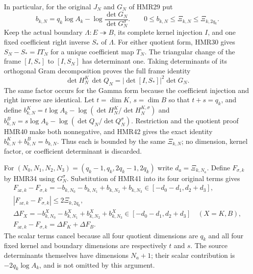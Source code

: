 \documentclass[11pt,a4paper]{article}
\begin{document}
In particular, for the original $J_N$ and $G_N$ of HMR29 put
\[
 b_{k,N}=q_k\log A_k-\log\frac{\det G_N}{\det G_N^\sigma}.
 \qquad 0\leq b_{k,N}\leq\Xi_{k,N}\leq\Xi_{k,2q_k}.
 \tag{HMR41}
\]
Keep the actual boundary $\Lambda:E\twoheadrightarrow B$,
its complete kernel injection $I$, and one fixed coefficient
right inverse $S_*$ of $\Lambda$. For either quotient form,
HMR30 gives $S_N-S_*=IT_N$ for a unique coefficient map $T_N$.
The triangular change of the frame $[I,S_*]$ to $[I,S_N]$
has determinant one. Taking determinants of its orthogonal
Gram decomposition proves the full frame identity
\[
 \det H_N^K\,\det Q_N
       =|\det[I,S_*]|^2\det G_N .
 \tag{HMR42}
\]
The same factor occurs for the Gamma form because the
coefficient injection and right inverse are identical.
Let $t=\dim K$, $s=\dim B$ so that $t+s=q_k$, and define
$b^K_{k,N}=t\log A_k-\log(\det H_N^K/\det H_N^{K,\sigma})$
and
$b^B_{k,N}=s\log A_k-\log(\det Q_N/\det Q_N^\sigma)$.
Restriction and the quotient proof HMR40 make both
nonnegative, and HMR42 gives the exact identity
$b^K_{k,N}+b^B_{k,N}=b_{k,N}$.
Thus each is bounded by the same $\Xi_{k,N}$; no dimension,
kernel factor, or coefficient determinant is discarded.

For $(N_0,N_1,N_2,N_3)=(q_k-1,q_k,2q_k-1,2q_k)$
write $d_a=\Xi_{k,N_a}$. Define $F_{\sigma,k}$ by HMR34
using $G_N^\sigma$. Substitution of HMR41 into its four
original terms gives
\[
\begin{gathered}
 F_{\mathrm{ar},k}-F_{\sigma,k}
       =-b_{k,N_0}-b_{k,N_1}+b_{k,N_2}+b_{k,N_3}
       \in[-d_0-d_1,d_2+d_3],\\
 |F_{\mathrm{ar},k}-F_{\sigma,k}|\leq2\Xi_{k,2q_k},\\
 \Delta F_X=-b^X_{k,N_0}-b^X_{k,N_1}
             +b^X_{k,N_2}+b^X_{k,N_3}
       \in[-d_0-d_1,d_2+d_3]\quad(X=K,B),\\
 F_{\mathrm{ar},k}-F_{\sigma,k}=\Delta F_K+\Delta F_B.
\end{gathered}\tag{HMR43}
\]
The scalar terms cancel because all four quotient dimensions
are $q_k$ and all four fixed kernel and boundary dimensions
are respectively $t$ and $s$. The source determinants themselves
have dimensions $N_a+1$; their scalar contribution is
$-2q_k\log A_k$, and is not omitted by this argument.
\end{document}
